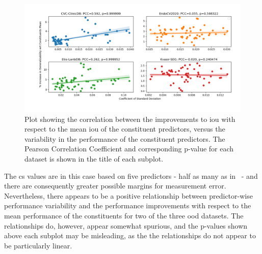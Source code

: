 \begin{figure}[htb]
    \centering
    \hspace*{-1.9cm}\includegraphics[width=1.2\linewidth]{illustrations/ensemble_variance_relationship_statistical.png}
     \caption[Relationship between ensemble improvements and constituents' performance variability]{Plot showing the correlation between the improvements to \gls{iou} with respect to the mean \gls{iou} of the constituent predictors, versus the variability in the performance of the constituent predictors. The Pearson Correlation Coefficient and corresponding p-value for each dataset is shown in the title of each subplot.}
    \label{fig:ensemble_var_stat}
\end{figure}

The \gls{cs} values are in this case based on five predictors - half as many as in~ - and there are consequently greater possible margins for measurement error. Nevertheless, there appears to be a positive relationship between predictor-wise performance variability and the performance improvements with respect to the mean performance of the constituents for two of the three \gls{ood} datasets. The relationships do, however, appear somewhat spurious, and the p-values shown above each subplot may be misleading, as the the relationships do not appear to be particularly linear. 

